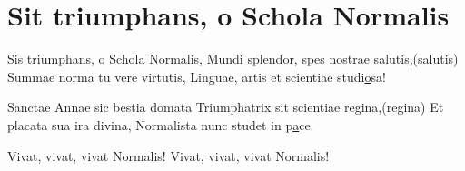 \section{Sit triumphans, o Schola Normalis}
\subtitle{Sulla melodia di “Salve invicta Juditha formosa” di A. Vivaldi}

\subtitle{Si ripete tutto due volte a gruppi di due versi, tranne i vivat}
\begin{canzone}
Sis triumphans, o Schola Normalis,
Mundi splendor, spes nostrae salutis,\hfill (salutis)
Summae norma tu vere virtutis,
Linguae, artis et scientiae studi\underline{o}sa!

Sanctae Annae sic bestia domata
Triumphatrix sit scientiae regina,\hfill (regina)
Et placata sua ira divina,
Normalista nunc studet in p\underline{a}ce.

Vivat, vivat, vivat Normalis!
Vivat, vivat, vivat Normalis!
\end{canzone}
